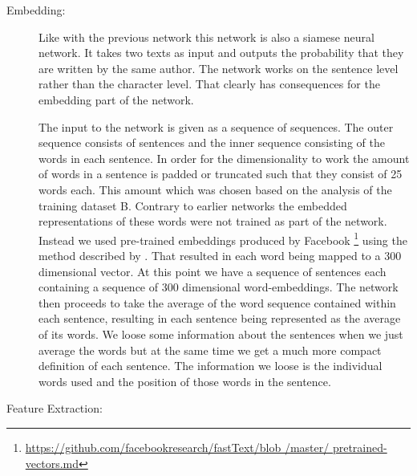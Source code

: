 \begin{description}

    \item[Embedding:]

        Like with the previous network this network is also a siamese neural
        network. It takes two texts as input and outputs the probability that
        they are written by the same author. The network works on the sentence
        level rather than the character level. That clearly has consequences for
        the embedding part of the network.

        The input to the network is given as a sequence of sequences. The outer
        sequence consists of sentences and the inner sequence consisting of the
        words in each sentence. In order for the dimensionality to work the
        amount of words in a sentence is padded or truncated such that they
        consist of 25 words each. This amount which was chosen based on the
        analysis of the training dataset \gls{B}. Contrary to earlier networks
        the embedded representations of these words were not trained as part of
        the network. Instead we used pre-trained embeddings produced by Facebook
        \footnote{\url{https://github.com/facebookresearch/fastText/blob
        /master/ pretrained-vectors.md}} using the method described by
        \citet{bojanowski2016enriching}. That resulted in each word being
        mapped to a 300 dimensional vector. At this point we have a sequence of
        sentences each containing a sequence of 300 dimensional word-embeddings.
        The network then proceeds to take the average of the word sequence
        contained within each sentence, resulting in each sentence being
        represented as the average of its words. We loose some information about
        the sentences when we just average the words but at the same time we
        get a much more compact definition of each sentence. The information
        we loose is the individual words used and the position of those words
        in the sentence. 

    \item[Feature Extraction:]


\end{description}
